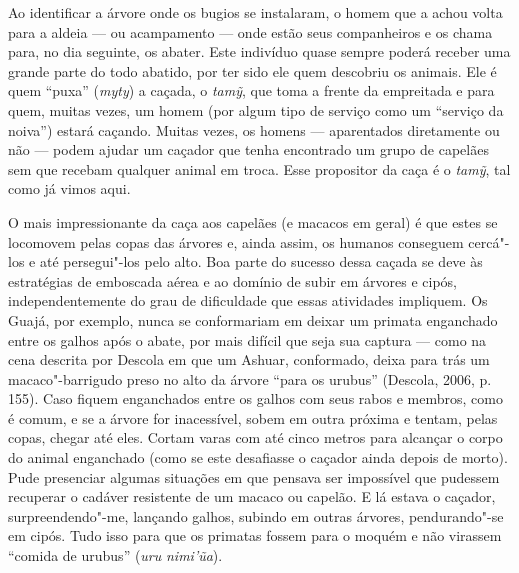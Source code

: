 Ao identificar a árvore onde os bugios se instalaram, o homem que a
achou volta para a aldeia --- ou acampamento --- onde estão seus
companheiros e os chama para, no dia seguinte, os abater. Este indivíduo
quase sempre poderá receber uma grande parte do todo abatido, por ter
sido ele quem descobriu os animais. Ele é quem ``puxa'' (\emph{myty}) a
caçada, o \emph{tamỹ}, que toma a frente da empreitada e para quem,
muitas vezes, um homem (por algum tipo de serviço como um ``serviço da
noiva'') estará caçando. Muitas vezes, os homens --- aparentados
diretamente ou não --- podem ajudar um caçador que tenha encontrado um
grupo de capelães sem que recebam qualquer animal em troca. Esse
propositor da caça é o \emph{tamỹ}, tal como já vimos aqui.

O mais impressionante da caça aos capelães (e macacos em geral) é que
estes se locomovem pelas copas das árvores e, ainda assim, os humanos
conseguem cercá"-los e até persegui"-los pelo alto. Boa parte do sucesso
dessa caçada se deve às estratégias de emboscada aérea e ao domínio de
subir em árvores e cipós, independentemente do grau de dificuldade que
essas atividades impliquem. Os Guajá, por exemplo, nunca se conformariam
em deixar um primata enganchado entre os galhos após o abate, por mais
difícil que seja sua captura --- como na cena descrita por Descola em que
um Ashuar, conformado, deixa para trás um macaco"-barrigudo preso no alto
da árvore ``para os urubus'' (Descola, 2006, p. 155). Caso fiquem
enganchados entre os galhos com seus rabos e membros, como é comum, e se
a árvore for inacessível, sobem em outra próxima e tentam, pelas copas,
chegar até eles. Cortam varas com até cinco metros para alcançar o corpo
do animal enganchado (como se este desafiasse o caçador ainda depois de
morto). Pude presenciar algumas situações em que pensava ser impossível
que pudessem recuperar o cadáver resistente de um macaco ou capelão. E
lá estava o caçador, surpreendendo"-me, lançando galhos, subindo em
outras árvores, pendurando"-se em cipós. Tudo isso para que os primatas
fossem para o moquém e não virassem ``comida de urubus'' (\emph{uru}
\emph{nimi'ũa}).


